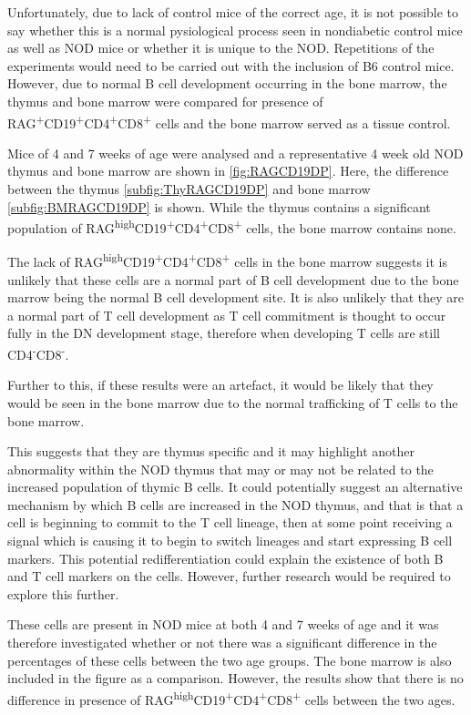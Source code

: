Unfortunately, due to lack of control mice of the correct age, it is not possible to say whether this is a normal pysiological process seen in nondiabetic control mice as well as NOD mice or whether it is unique to the NOD.
Repetitions of the experiments would need to be carried out with the inclusion of B6 control mice.
However, due to normal B cell development occurring in the bone marrow, the thymus and bone marrow were compared for presence of RAG\textsuperscript{+}CD19\textsuperscript{+}CD4\textsuperscript{+}CD8\textsuperscript{+} cells and the bone marrow served as a tissue control.

Mice of 4 and 7 weeks of age were analysed and a representative 4 week old NOD thymus and bone marrow are shown in \cref{fig:RAGCD19DP}. 
Here, the difference between the thymus \cref{subfig:ThyRAGCD19DP} and bone marrow \cref{subfig:BMRAGCD19DP} is shown.
While the thymus contains a significant population of RAG\textsuperscript{high}CD19\textsuperscript{+}CD4\textsuperscript{+}CD8\textsuperscript{+} cells, the bone marrow contains none.

The lack of RAG\textsuperscript{high}CD19\textsuperscript{+}CD4\textsuperscript{+}CD8\textsuperscript{+} cells in the bone marrow suggests it is unlikely that these cells are a normal part of B cell development due to the bone marrow being the normal B cell development site.
It is also unlikely that they are a normal part of T cell development as T cell commitment is thought to occur fully in the DN development stage, therefore when developing T cells are still CD4\textsuperscript{-}CD8\textsuperscript{-}.

Further to this, if these results were an artefact, it would be likely that they would be seen in the bone marrow due to the normal trafficking of T cells to the bone marrow.

This suggests that they are thymus specific and it may highlight another abnormality within the NOD thymus that may or may not be related to the increased population of thymic B cells.
It could potentially suggest an alternative mechanism by which B cells are increased in the NOD thymus, and that is that a cell is beginning to commit to the T cell lineage, then at some point receiving a signal which is causing it to begin to switch lineages and start expressing B cell markers.
This potential redifferentiation could explain the existence of both B and T cell markers on the cells. 
However, further research would be required to explore this further.

These cells are present in NOD mice at both 4 and 7 weeks of age and it was therefore investigated whether or not there was a significant difference in the percentages of these cells between the two age groups. 
The bone marrow is also included in the figure as a comparison.
However, the results show that there is no difference in presence of RAG\textsuperscript{high}CD19\textsuperscript{+}CD4\textsuperscript{+}CD8\textsuperscript{+} cells between the two ages.



